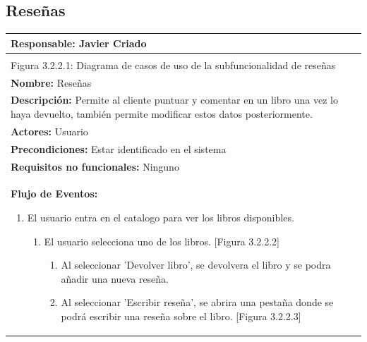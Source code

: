 \documentclass{report}
\begin{document}
            \subsection{Reseñas}
                \begin{center}
                    \begin{longtable}{|p{\linewidth}|}
                        \hline
                        \textbf{Responsable:} Javier Criado\\
                        \hline
                        \begin{figure}[H]
                            \centering
                            \texttt{[image: ./img/casos\_uso/Reseñas.jpg]}
                            \\Figura 3.2.2.1: Diagrama de casos de uso de la subfuncionalidad de reseñas
                        \end{figure}\\
                        \hline
                        \textbf{Nombre:} Reseñas\\
                        \hline
                        \textbf{Descripción:} Permite al cliente puntuar y comentar en un libro una vez lo haya devuelto, también permite modificar estos datos posteriormente.\\
                        \hline
                        \textbf{Actores:} Usuario\\
                        \hline
                        \textbf{Precondiciones:} Estar identificado en el sistema\\
                        \hline
                        \textbf{Requisitos no funcionales:} Ninguno\\
                        \hline
                        \textbf{Flujo de Eventos:}
                        \begin{enumerate}
                            \item El usuario entra en el catalogo para ver los libros disponibles.
                            \begin{enumerate}
                                \item El usuario selecciona uno de los libros. [Figura 3.2.2.2]
                                \begin{enumerate}
                                    \item Al seleccionar 'Devolver libro', se devolvera el libro y se podra añadir una nueva reseña.
                                    \item Al seleccionar 'Escribir reseña', se abrira una pestaña donde se podrá escribir una reseña sobre el libro. [Figura 3.2.2.3]

\end{enumerate}
\end{enumerate}
\end{enumerate}
\end{longtable}
\end{center}
\end{document}
